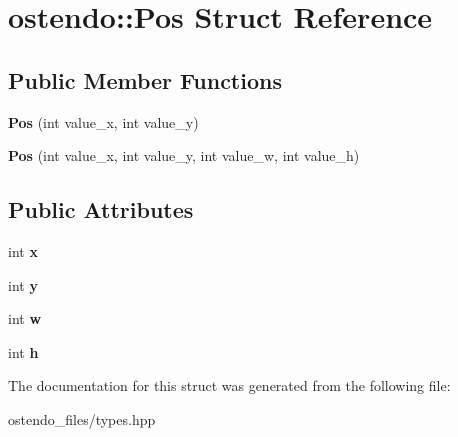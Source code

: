 \hypertarget{structostendo_1_1Pos}{}\section{ostendo\+:\+:Pos Struct Reference}
\label{structostendo_1_1Pos}
\subsection*{Public Member Functions}
\begin{DoxyCompactItemize}
\item 
\mbox{\label{structostendo_1_1Pos_a2a22e8ea6064992f404769b93f685669}} 
{\bfseries Pos} (int value\+\_\+x, int value\+\_\+y)
\item 
\mbox{\label{structostendo_1_1Pos_a3401ddc5e051daa5d6e485fc3c12edcf}} 
{\bfseries Pos} (int value\+\_\+x, int value\+\_\+y, int value\+\_\+w, int value\+\_\+h)
\end{DoxyCompactItemize}
\subsection*{Public Attributes}
\begin{DoxyCompactItemize}
\item 
\mbox{\label{structostendo_1_1Pos_a123081aea927725b236b54b208b491f7}} 
int {\bfseries x}
\item 
\mbox{\label{structostendo_1_1Pos_a896a4cd18785ab58133d2f1eeea49fab}} 
int {\bfseries y}
\item 
\mbox{\label{structostendo_1_1Pos_ab5fd0f24e24d324fbd2fdab6b474ad6d}} 
int {\bfseries w}
\item 
\mbox{\label{structostendo_1_1Pos_a5767feb86934899b7916e5a0cc5093f0}} 
int {\bfseries h}
\end{DoxyCompactItemize}


The documentation for this struct was generated from the following file\+:\begin{DoxyCompactItemize}
\item 
ostendo\+\_\+files/types.\+hpp\end{DoxyCompactItemize}
